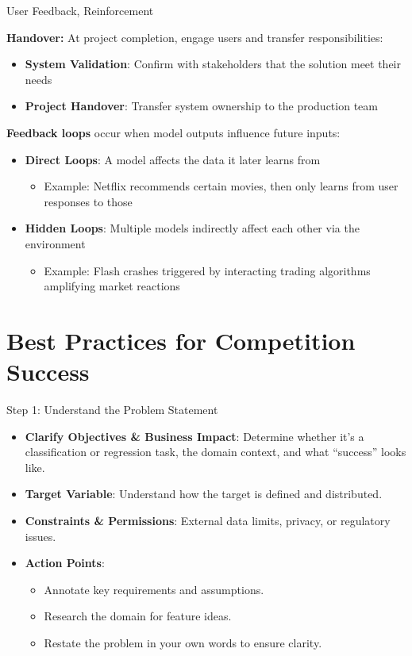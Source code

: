 \documentclass[10pt,compress,t,notes=noshow, xcolor=table]{beamer}
\begin{document}
\begin{frame}{User Feedback, Reinforcement}
\label{user-feedback-and-acceptance}


\textbf{Handover:} At project completion, engage users and transfer responsibilities:

\begin{itemize}
  \item \textbf{System Validation}: Confirm with stakeholders that the solution meet their needs
  \item \textbf{Project Handover}: Transfer system ownership to the production team
\end{itemize}

\textbf{Feedback loops} occur when model outputs influence future inputs:

\begin{itemize}
  \item \textbf{Direct Loops}: A model affects the data it later learns from
    \begin{itemize}
      \item Example: Netflix recommends certain movies, then only learns from user responses to those
    \end{itemize}
  \item \textbf{Hidden Loops}: Multiple models indirectly affect each other via the environment
    \begin{itemize}
      \item Example: Flash crashes triggered by interacting trading algorithms amplifying market reactions
    \end{itemize}
\end{itemize}
\end{frame}


\section{Best Practices for Competition Success}
\begin{frame}{Step 1: Understand the Problem Statement}
\begin{itemize}
  \item \textbf{Clarify Objectives \& Business Impact}: Determine whether it's a classification or regression task, the domain context, and what “success” looks like.
  \item \textbf{Target Variable}: Understand how the target is defined and distributed.
  \item \textbf{Constraints \& Permissions}: External data limits, privacy, or regulatory issues.
  \item \textbf{Action Points}:
    \begin{itemize}
      \item Annotate key requirements and assumptions.
      \item Research the domain for feature ideas.
      \item Restate the problem in your own words to ensure clarity.
    \end{itemize}
\end{itemize}
\end{frame}
\end{document}
